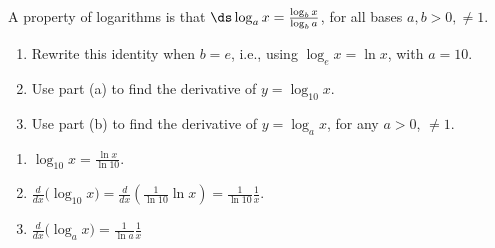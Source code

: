 {A property of logarithms is that $\ds \log_a x = \frac{\log_b x}{\log_b a}$, for all bases $a,b>0,\neq 1$.
\begin{enumerate}
	\item Rewrite this identity when $b=e$, i.e., using $\log_ex =\ln x$, with $a=10$.
	\item	Use part (a) to find the derivative of $y=\log_{10} x$. 
	\item	Use part (b) to find the derivative of $y=\log_{a} x$, for any $a>0$, $\neq 1$.
	\enlargethispage{1\baselineskip}
\end{enumerate}
}
{\begin{enumerate}
	\item $\log_{10}x = \frac{\ln x}{\ln 10}$.
	\item	$\frac{d}{dx}\big(\log_{10}x\big) = \frac{d}{dx}\left(\frac{1}{\ln 10}\ln x\right) = \frac{1}{\ln 10}\frac1x$.
	\item	$\frac{d}{dx}\big(\log_{a}x\big) = \frac{1}{\ln a}\frac1x$
\end{enumerate}
}

